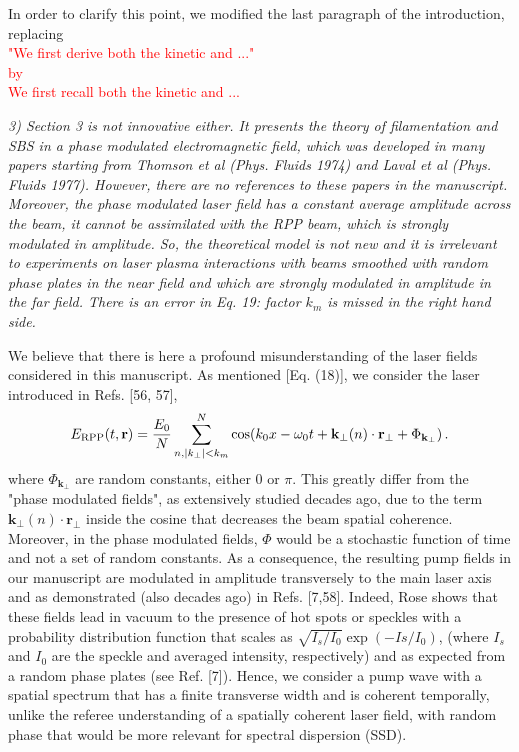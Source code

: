 \documentclass{article}
\begin{document}
In order to clarify this point, we modified the last paragraph of the introduction, replacing \\
\textcolor{red}{"We first derive both the kinetic and ..." \\
by\\
We first recall both the kinetic and ...
}

\textit{
    3) Section 3 is not innovative either. It presents the theory of filamentation and SBS in a phase modulated electromagnetic field, which was developed in many papers starting from Thomson et al (Phys. Fluids 1974) and Laval et al (Phys. Fluids 1977). However, there are no references to these papers in the manuscript. Moreover, the phase modulated laser field has a constant average amplitude across the beam, it cannot be assimilated with the RPP beam, which is strongly modulated in amplitude. So, the theoretical model is not new and it is irrelevant to experiments on laser plasma interactions with beams smoothed with random phase plates in the near field and which are strongly modulated in amplitude in the far field. There is an error in Eq. 19: factor $k_m$ is missed in the right hand side. }

We believe that there is here a profound misunderstanding of the laser fields considered in this manuscript. 
As mentioned [Eq. (18)], we consider the  laser introduced in Refs. [56, 57], 
\begin{align}
E_{\rm RPP}(t,\mathbf{r})  = \frac{E_0}{N} \sum_{n,\vert k_{\perp}\vert<k_m }^N  \cos(k_0x - \omega_0t +\mathbf{k}_\perp(n) \cdot \mathbf{r}_\perp +\Phi_{\mathbf{k}_\perp})\, . \label{eq:erpp}
 \end{align}
where $\Phi_{\mathbf{k}_\perp}$ are random constants, either $0$ or $\pi$.
This greatly differ from the "phase modulated fields", as extensively studied decades ago, due to the term $\mathbf{k}_\perp(n) \cdot \mathbf{r}_\perp $ inside the cosine that decreases the beam spatial coherence. Moreover, in the phase modulated fields, $\Phi$ would be a stochastic function of time and not a set of random constants.  
As a consequence, the resulting pump fields in our manuscript are modulated in amplitude transversely to the main laser axis and as demonstrated   (also decades ago) in Refs. [7,58]. Indeed, Rose shows that these fields lead in vacuum  to the presence of hot spots or speckles with a probability distribution function that scales as $\sqrt{I_s/I_0}\exp(-Is/I_0) $, (where $I_s$ and $I_0$ are the speckle and averaged intensity, respectively) and as expected from a random phase plates (see Ref. [7]). 
Hence, we consider a pump wave with a spatial spectrum that has a finite transverse width and is coherent temporally, unlike the referee understanding of a  spatially coherent laser field, with random phase that would be more relevant for spectral dispersion (SSD). 
\end{document}
